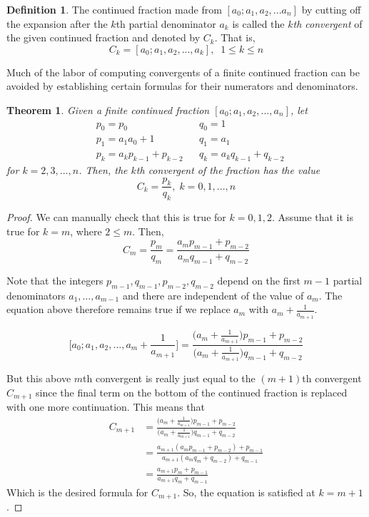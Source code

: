 \documentclass{article}
\newtheorem{theorem}{Theorem}[section]
\theoremstyle{remark}
\theoremstyle{definition}
\newtheorem{definition}{Definition}[section]
\begin{document}
\begin{definition}
The continued fraction made from $[a_0;a_1, a_2, ... a_n]$ by cutting off the expansion after the $k$th partial denominator $a_k$ is called the \textit{$k$th convergent} of the given continued fraction and denoted by $C_k$. That is, 
\[C_k = [a_0;a_1, a_2, ..., a_k], \;\; 1 \leq k \leq n\]
\end{definition}

Much of the labor of computing convergents of a finite continued fraction can be avoided by establishing certain formulas for their numerators and denominators. 

\begin{theorem}
Given a finite continued fraction $[a_0; a_1, a_2, ..., a_n]$, let 
\begin{align*}
    &p_0 = p_0 & &q_0 = 1 \\
    &p_1 = a_1 a_0 + 1 & &q_1 = a_1 \\
    &p_k = a_k p_{k-1} + p_{k-2} & &q_k = a_k q_{k-1} + q_{k-2} 
\end{align*}
for $k = 2, 3, ..., n$. Then, the $k$th convergent of the fraction has the value 
\[C_k = \frac{p_k}{q_k}, \; k = 0, 1, ..., n\]
\end{theorem}
\begin{proof}
We can manually check that this is true for $k = 0, 1, 2$. Assume that it is true for $k=m$, where $2 \leq m$. Then, 
  \[C_m = \frac{p_m}{q_m} = \frac{a_m p_{m-1} + p_{m-2}}{a_m q_{m-1} + q_{m-2}}\]

Note that the integers $p_{m-1}, q_{m-1}, p_{m-2}, q_{m-2}$ depend on the first $m-1$ partial denominators $a_1, \ldots, a_{m-1}$ and there are independent of the value of $a_m$. The equation above therefore remains true if we replace $a_m$ with $a_m + \frac{1}{a_{m+1}}$. 

  \[\Big[a_0;a_1, a_2, \ldots, a_m + \frac{1}{a_{m+1}} \Big] = \frac{\Big( a_m + \frac{1}{a_{m+1}} \Big) p_{m-1} + p_{m-2}}{\Big( a_m + \frac{1}{a_{m+1}} \Big) q_{m-1} + q_{m-2}}\]

But this above $m$th convergent is really just equal to the $(m+1)$th convergent $C_{m+1}$ since the final term on the bottom of the continued fraction is replaced with one more continuation. This means that
\begin{align*}
    C_{m+1} & = \frac{\Big( a_m + \frac{1}{a_{m+1}} \Big) p_{m-1} + p_{m-2}}{\Big( a_m + \frac{1}{a_{m+1}} \Big) q_{m-1} + q_{m-2}} \\
    & = \frac{a_{m+1} (a_m p_{m-1} + p_{m-2}) + p_{m-1}}{a_{m+1} (a_m q_m + q_{m-2}) + q_{m-1}} \\ 
    & = \frac{a_{m+1} p_m + p_{m-1}}{a_{m+1} q_m + q_{m-1}}
\end{align*}
Which is the desired formula for $C_{m+1}$. So, the equation is satisfied at $k=m+1$. 
\end{proof}
\end{document}
